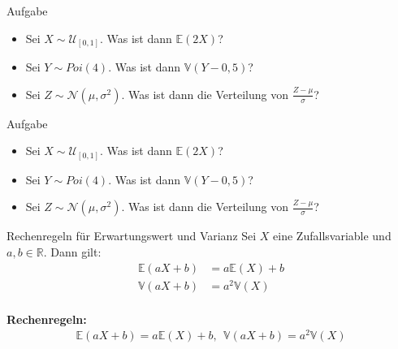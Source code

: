 \documentclass[t,11pt]{beamer}
\begin{document}
	\subtitle{}
	\logo{}
	\institute{}
	\date{}
	\subject{}

\addtocounter{framenumber}{-1}

\begin{frame}
	\begin{block}{Aufgabe}
		\begin{itemize}[<+->]
			\item Sei $X\sim \mathcal{U}_{[0,1]}$. Was ist dann $\mathbb{E}(2X)$? 
			\item Sei $Y\sim Poi(4)$. Was ist dann $\mathbb{V}(Y-0,5)$? 
			\item Sei $Z\sim \mathcal{N}(\mu,\sigma^2)$. Was ist dann die Verteilung von $\frac{Z-\mu}{\sigma} $?
		\end{itemize}
	\end{block}
\end{frame}

\begin{frame}
\begin{block}{Aufgabe}
	\begin{itemize}%
		\item Sei $X\sim \mathcal{U}_{[0,1]}$. Was ist dann $\mathbb{E}(2X)$? 
		\item Sei $Y\sim Poi(4)$. Was ist dann $\mathbb{V}(Y-0,5)$? 
		\item Sei $Z\sim \mathcal{N}(\mu,\sigma^2)$. Was ist dann die Verteilung von $\frac{Z-\mu}{\sigma} $?
	\end{itemize}
\end{block}
\begin{alertblock}{Rechenregeln für Erwartungswert und Varianz}
	Sei $X$ eine Zufallsvariable und $a,b\in\mathbb{R}$. Dann gilt:
	\begin{align*}
	\mathbb{E}(aX+b) &= a\mathbb{E}(X) + b \\
	\mathbb{V}(aX+b) &= a^2\mathbb{V}(X) \\
	\end{align*}
\end{alertblock}
\end{frame}

\begin{frame}
\textbf{Rechenregeln:}
\begin{align*}
\mathbb{E}(aX+b) = a\mathbb{E}(X) + b, \ \
\mathbb{V}(aX+b) = a^2\mathbb{V}(X) 
\end{align*}
\end{frame}
\end{document}
